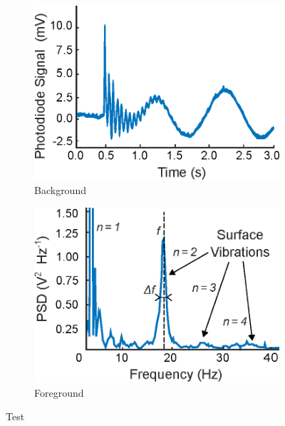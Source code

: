 \documentclass{physics_article_B}
\begin{document}
\begin{figure}[H]
\centering
\begin{subfigure}[b]{0.48\textwidth}                \hspace*{-1cm}\includegraphics[width=\textwidth]{Figures/TempertonSignal.eps}
\caption{Background}
\label{fig:detector:test}
\end{subfigure}\hspace{3pt}
\begin{subfigure}[b]{0.48\textwidth} \hspace*{-0.5cm}\includegraphics[width=\textwidth]{Figures/TempertonSignalPD.eps}
\caption{Foreground}
\label{fig:detector:test}
\end{subfigure}
\caption{Test}\label{fig:test}
\end{figure}
\end{document}
